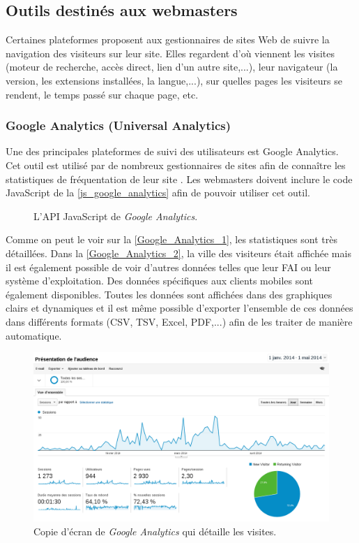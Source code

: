 \subsection{Outils destinés aux webmasters}
Certaines plateformes proposent aux gestionnaires de sites Web de suivre la navigation des visiteurs sur leur site. Elles regardent d'où viennent les visites (moteur de recherche, accès direct, lien d'un autre site,...), leur navigateur (la version, les extensions installées, la langue,...), sur quelles pages les visiteurs se rendent, le temps passé sur chaque page, etc.

\subsubsection{Google Analytics (Universal Analytics)}
\label{google_analytics}
Une des principales plateformes de suivi des utilisateurs est Google Analytics. Cet outil est utilisé par de nombreux gestionnaires de sites afin de connaître les statistiques de fréquentation de leur site \cite{javascript_google_analytics}. Les webmasters doivent inclure le code JavaScript de la \autoref{js_google_analytics} afin de pouvoir utiliser cet outil.
\newline

\begin{figure}[!h]
	\centering
	
	\caption{\label{js_google_analytics}L'API JavaScript de \textit{Google Analytics}.}
\end{figure}

Comme on peut le voir sur la \autoref{Google_Analytics_1}, les statistiques sont très détaillées. Dans la \autoref{Google_Analytics_2}, la ville des visiteurs était affichée mais il est également possible de voir d'autres données telles que leur FAI ou leur système d'exploitation. Des données spécifiques aux clients mobiles sont également disponibles. Toutes les données sont affichées dans des graphiques clairs et dynamiques et il est même possible d'exporter l'ensemble de ces données dans différents formats (CSV, TSV, Excel, PDF,...) afin de les traiter de manière automatique.

\begin{figure}[!h]
	\centering
	\includegraphics[scale=0.36]{figures/Google_Analytics_1.png}
	\caption{\label{Google_Analytics_1}Copie d'écran de \textit{Google Analytics} qui détaille les visites.}
\end{figure}

